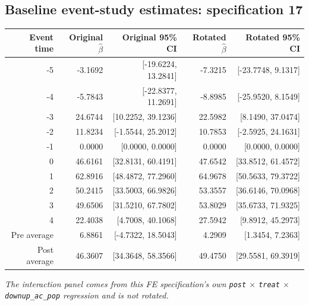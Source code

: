 \documentclass[10pt]{article}
\begin{document}
\subsection*{Baseline event-study estimates: specification 17}
\begin{center}
\scriptsize
\begin{tabular}{r rr rr}
\toprule
Event time & Original $\hat\beta$ & Original 95\% CI & Rotated $\hat\beta$ & Rotated 95\% CI \\
\midrule
-5 & -3.1692 & [-19.6224, 13.2841] & -7.3215 & [-23.7748, 9.1317] \\
-4 & -5.7843 & [-22.8377, 11.2691] & -8.8985 & [-25.9520, 8.1549] \\
-3 & 24.6744 & [10.2252, 39.1236] & 22.5982 & [8.1490, 37.0474] \\
-2 & 11.8234 & [-1.5544, 25.2012] & 10.7853 & [-2.5925, 24.1631] \\
-1 & 0.0000 & [0.0000, 0.0000] & 0.0000 & [0.0000, 0.0000] \\
0 & 46.6161 & [32.8131, 60.4191] & 47.6542 & [33.8512, 61.4572] \\
1 & 62.8916 & [48.4872, 77.2960] & 64.9678 & [50.5633, 79.3722] \\
2 & 50.2415 & [33.5003, 66.9826] & 53.3557 & [36.6146, 70.0968] \\
3 & 49.6506 & [31.5210, 67.7802] & 53.8029 & [35.6733, 71.9325] \\
4 & 22.4038 & [4.7008, 40.1068] & 27.5942 & [9.8912, 45.2973] \\
\midrule
Pre average & 6.8861 & [-4.7322, 18.5043] & 4.2909 & [1.3454, 7.2363] \\
Post average & 46.3607 & [34.3648, 58.3566] & 49.4750 & [29.5581, 69.3919] \\
\bottomrule
\end{tabular}
\end{center}
\medskip
\textit{The interaction panel comes from this FE specification's own \texttt{post} $\times$ \texttt{treat} $\times$ \texttt{downup\_ac\_pop} regression and is not rotated.}
\clearpage
\end{document}
